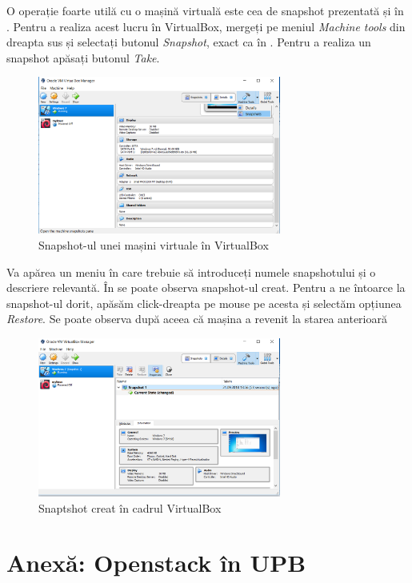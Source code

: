 O operație foarte utilă cu o mașină virtuală este cea de snapshot prezentată și
în . Pentru a realiza acest lucru în
VirtualBox, mergeți pe meniul \textit{Machine tools} din dreapta sus și
selectați butonul \textit{Snapshot}, exact ca în
. Pentru a realiza un snapshot
apăsați butonul \textit{Take}.

\begin{figure}[!htbp]
	\centering
	\includegraphics[width=8cm]{chapters/14-vm/img/vbox-snapshot-img.png}
	\caption{Snapshot-ul unei mașini virtuale în VirtualBox}
	\label{fig:vm-vbox-snapshot}
\end{figure}

Va apărea un meniu în care trebuie să introduceți numele snapshotului și o
descriere relevantă. În  se
poate observa snapshot-ul creat. Pentru a ne întoarce la snapshot-ul dorit,
apăsăm click-dreapta pe mouse pe acesta și selectăm opțiunea \textit{Restore}.
Se poate observa după aceea că mașina a revenit la starea anterioară

\begin{figure}[!htbp]
	\centering
	\includegraphics[width=8cm]{chapters/14-vm/img/vbox-view-snapshot-img.png}
	\caption{Snaptshot creat în cadrul VirtualBox}
	\label{fig:vm-vbox-view-snapshot}
\end{figure}

\section{Anexă: Openstack în UPB}
\label{sec:vm-openstack}

